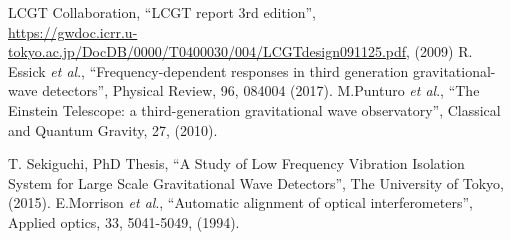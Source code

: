 \vspace{2mm}
  LCGT Collaboration, ``LCGT report 3rd edition'', \\\href{https://gwdoc.icrr.u-tokyo.ac.jp/DocDB/0029/T1402971/001/141106_seismic_noise.pdf}{https://gwdoc.icrr.u-tokyo.ac.jp/DocDB/0000/T0400030/004/LCGTdesign091125.pdf}, (2009)
\vspace{2mm}
  R. Essick \textit{et al}., ``Frequency-dependent responses in third generation gravitational-wave detectors'', Physical Review, 96, 084004 (2017).
\vspace{2mm}
  M.Punturo \textit{et al}., ``The Einstein Telescope: a third-generation gravitational wave observatory'', Classical and Quantum Gravity, 27, (2010).


\vspace{6mm}
 T. Sekiguchi, PhD Thesis, ``A Study of Low Frequency Vibration Isolation System for Large Scale Gravitational Wave Detectors'', The University of Tokyo, (2015).
\vspace{2mm}
  E.Morrison \textit{et al}., ``Automatic alignment of optical interferometers'', Applied optics, 33, 5041-5049, (1994).


